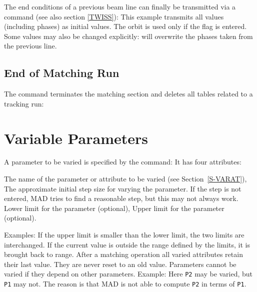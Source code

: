 The end conditions of a previous beam line can finally be transmitted
via a  command
(see also section \ref{TWISS}):
This example transmits all values (including phases) as initial
values.
The orbit is used only if the flag  is entered.
Some values may also be changed explicitly:
will overwrite the phases taken from the previous line.
\subsection{End of Matching Run}
The  command terminates the matching section
and deletes all tables related to a tracking run:
\section{Variable Parameters}
\label{S-VARY}
A parameter to be varied is specified by the  command:
It has four attributes:
\begin{mylist}
The name of the parameter or attribute to be varied
(see Section~\ref{S-VARAT}),
The approximate initial step size for varying the parameter.
If the step is not entered, MAD tries to find a reasonable step,
but this may not always work.
Lower limit for the parameter (optional),
Upper limit for the parameter (optional).
\end{mylist}
Examples:
If the upper limit is smaller than the lower limit,
the two limits are interchanged.
If the current value is outside the range defined by the limits,
it is brought back to range.
After a matching operation all varied attributes retain their last value.
They are never reset to an old value.
Parameters cannot be varied if they depend on other parameters.
Example:
Here {\tt P2} may be varied, but {\tt P1} may not.
The reason is that MAD is not able to compute {\tt P2}
in terms of {\tt P1}.

